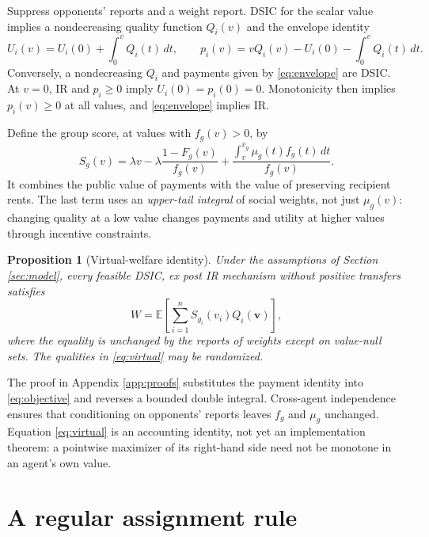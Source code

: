 \documentclass[11pt]{article}
\newtheorem{proposition}{Proposition}
\newcommand{\E}{\mathbb E}
\begin{document}
Suppress opponents' reports and a weight report. DSIC for the scalar value implies a nondecreasing quality function $Q_i(v)$ and the envelope identity
\begin{equation}\label{eq:envelope}
U_i(v)=U_i(0)+\int_0^v Q_i(t)\,dt,
\qquad
p_i(v)=vQ_i(v)-U_i(0)-\int_0^vQ_i(t)\,dt.
\end{equation}
Conversely, a nondecreasing $Q_i$ and payments given by \eqref{eq:envelope} are DSIC. At $v=0$, IR and $p_i\ge0$ imply $U_i(0)=p_i(0)=0$. Monotonicity then implies $p_i(v)\ge0$ at all values, and \eqref{eq:envelope} implies IR.

Define the group score, at values with $f_g(v)>0$, by
\begin{equation}\label{eq:score}
S_g(v)=\lambda v-\lambda\frac{1-F_g(v)}{f_g(v)}
+\frac{\int_v^{\bar v_g}\mu_g(t)f_g(t)\,dt}{f_g(v)}.
\end{equation}
It combines the public value of payments with the value of preserving recipient rents. The last term uses an \emph{upper-tail integral} of social weights, not just $\mu_g(v)$: changing quality at a low value changes payments and utility at higher values through incentive constraints.

\begin{proposition}[Virtual-welfare identity]\label{prop:identity}
Under the assumptions of Section \ref{sec:model}, every feasible DSIC, ex post IR mechanism without positive transfers satisfies
\begin{equation}\label{eq:virtual}
W=\E\!\left[\sum_{i=1}^n S_{g_i}(v_i)Q_i(\mathbf v)\right],
\end{equation}
where the equality is unchanged by the reports of weights except on value-null sets. The qualities in \eqref{eq:virtual} may be randomized.
\end{proposition}

The proof in Appendix \ref{app:proofs} substitutes the payment identity into \eqref{eq:objective} and reverses a bounded double integral. Cross-agent independence ensures that conditioning on opponents' reports leaves $f_g$ and $\mu_g$ unchanged. Equation \eqref{eq:virtual} is an accounting identity, not yet an implementation theorem: a pointwise maximizer of its right-hand side need not be monotone in an agent's own value.

\section{A regular assignment rule}\label{sec:regular}
\end{document}
